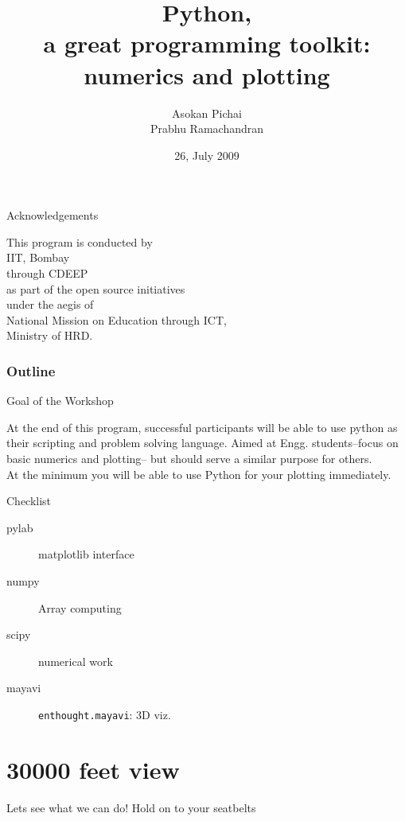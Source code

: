 \documentclass[14pt,compress]{beamer}
\title[Basic Python]{Python,\\a great programming toolkit:\\
numerics and plotting}
\author[Asokan \& Prabhu] {Asokan Pichai\\Prabhu Ramachandran}
\institute[IIT Bombay] {Department of Aerospace Engineering\\IIT Bombay}
\date[] {26, July 2009}
\newcommand{\typ}[1]{\texttt{#1}}
\begin{document}
\begin{frame}
  \titlepage
\end{frame}
\begin{frame}
  {Acknowledgements}
  \begin{center}
  This program is conducted by\\
  IIT, Bombay\\
  through CDEEP\\
  as part of  the open source initiatives\\
  under the aegis of\\
  \alert{National Mission on Education through ICT,} \\
  Ministry of HRD.
  \end{center}
\end{frame}

\begin{frame}
  \frametitle{Outline}
  \tableofcontents
\end{frame}

\begin{frame}{Goal of the Workshop}

        At the end of this program, successful participants will be able
        to use python as their scripting and problem solving language.
        Aimed at Engg. students--focus on basic numerics and plotting--
        but should serve a similar purpose for others.\\

        At the minimum you will be able to use Python for your plotting immediately.

\end{frame}

\begin{frame}{Checklist}
    
  \begin{description}
	\item[pylab] matplotlib interface 
	\item[numpy] Array computing
        \item[scipy] numerical work
        \item[mayavi] \typ{enthought.mayavi}: 3D viz.
  \end{description}
\end{frame}

\section{30000 feet view}
\begin{frame}{Lets see what we can do!}
  \huge
  Hold on to your seatbelts
\end{frame}
\end{document}
